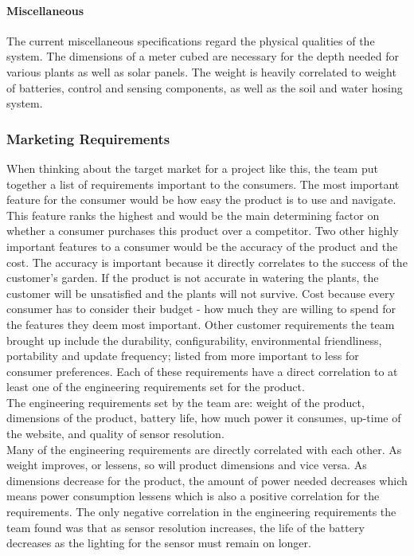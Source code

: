 \paragraph{Miscellaneous}
The current miscellaneous specifications regard the physical qualities of the system. The dimensions of a meter cubed are necessary for the depth needed for various plants as well as solar panels. The weight is heavily correlated to weight of batteries, control and sensing components, as well as the soil and water hosing system. 
\subsubsection{Marketing Requirements}
When thinking about the target market for a project like this, the team put together a list of requirements important to the consumers. The most important feature for the consumer would be how easy the product is to use and navigate. This feature ranks the highest and would be the main determining factor on whether a consumer purchases this product over a competitor. Two other highly important features to a consumer would be the accuracy of the product and the cost. The accuracy is important because it directly correlates to the success of the customer's garden. If the product is not accurate in watering the plants, the customer will be unsatisfied and the plants will not survive. Cost because every consumer has to consider their budget - how much they are willing to spend for the features they deem most important. Other customer requirements the team brought up include the durability, configurability, environmental friendliness, portability and update frequency; listed from more important to less for consumer preferences. Each of these requirements have a direct correlation to at least one of the engineering requirements set for the product. \\

The engineering requirements set by the team are: weight of the product, dimensions of the product, battery life, how much power it consumes, up-time of the website, and quality of sensor resolution. \\

Many of the engineering requirements are directly correlated with each other. As weight improves, or lessens, so will product dimensions and vice versa. As dimensions decrease for the product, the amount of power needed decreases which means power consumption lessens which is also a positive correlation for the requirements. The only negative correlation in the engineering requirements the team found was that as sensor resolution increases, the life of the battery decreases as the lighting for the sensor must remain on longer. \\
 

